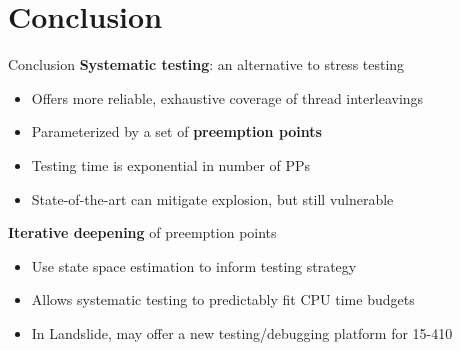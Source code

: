 \documentclass[xcolor=dvipsnames]{beamer}
\begin{document}
\section{Conclusion}


\begin{frame}{Conclusion}
	\textbf{Systematic testing}: an alternative to stress testing
	\begin{itemize}
		\item Offers more reliable, exhaustive coverage of thread interleavings
		\item Parameterized by a set of {\bf preemption points}
		\item Testing time is exponential in number of PPs %
		\item State-of-the-art can mitigate explosion, but still vulnerable
	\end{itemize}
	\linegap

	{\bf Iterative deepening} of preemption points
	\begin{itemize}
		\item Use state space estimation to inform testing strategy
		\item Allows systematic testing to predictably fit CPU time budgets
		\item In Landslide, may offer a new testing/debugging platform for 15-410
	\end{itemize}
\end{frame}


\end{document}
